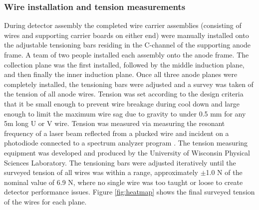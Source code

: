 

\subsubsection{Wire installation and tension measurements}
During detector assembly the completed wire carrier assemblies (consisting of wires and supporting carrier boards on either end) were manually installed onto the adjustable tensioning bars residing in the C-channel of the supporting anode frame.  A team of two people installed each assembly onto the anode frame.  The collection plane was the first installed, followed by the middle induction plane, and then finally the inner induction plane.  Once all three anode planes were completely installed, the tensioning bars were adjusted and a survey was taken of the tension of all anode wires.  Tension was set according to the design criteria that it be small enough to prevent wire breakage during cool down and large enough to limit the maximum wire sag due to gravity to under 0.5 mm for any 5m long U or V wire.   Tension was measured via measuring the resonant frequency of a laser beam reflected from a plucked wire and incident on a photodiode connected to a spectrum analyzer program \cite{SpectrumLaboratory}.  The tension measuring equipment was developed and produced by the University of Wisconsin Physical Sciences Laboratory.  The tensioning bars were adjusted iteratively until the surveyed tension of all wires was within a range, approximately $\pm$1.0 N of the nominal value of 6.9 N, where no single wire was too taught or loose to create detector performance issues.  Figure \ref{fig:heatmap} shows the final surveyed tension of the wires for each plane.

